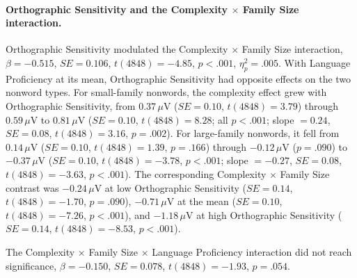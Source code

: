 \paragraph*{Orthographic Sensitivity and the Complexity $\times$ Family Size interaction.} Orthographic Sensitivity modulated the Complexity $\times$ Family Size interaction, $\beta = -0.515$, $SE = 0.106$, $t(4848) = -4.85$, $p < .001$, $\eta^2_p = .005$. With Language Proficiency at its mean, Orthographic Sensitivity had opposite effects on the two nonword types. For small-family nonwords, the complexity effect grew with Orthographic Sensitivity, from $0.37\,\mu$V ($SE = 0.10$, $t(4848) = 3.79$) through $0.59\,\mu$V to $0.81\,\mu$V ($SE = 0.10$, $t(4848) = 8.28$; all $p < .001$; slope $= 0.24$, $SE = 0.08$, $t(4848) = 3.16$, $p = .002$). For large-family nonwords, it fell from $0.14\,\mu$V ($SE = 0.10$, $t(4848) = 1.39$, $p = .166$) through $-0.12\,\mu$V ($p = .090$) to $-0.37\,\mu$V ($SE = 0.10$, $t(4848) = -3.78$, $p < .001$; slope $= -0.27$, $SE = 0.08$, $t(4848) = -3.63$, $p < .001$). The corresponding Complexity $\times$ Family Size contrast was $-0.24\,\mu$V at low Orthographic Sensitivity ($SE = 0.14$, $t(4848) = -1.70$, $p = .090$), $-0.71\,\mu$V at the mean ($SE = 0.10$, $t(4848) = -7.26$, $p < .001$), and $-1.18\,\mu$V at high Orthographic Sensitivity ($SE = 0.14$, $t(4848) = -8.53$, $p < .001$).

The Complexity $\times$ Family Size $\times$ Language Proficiency interaction did not reach significance, $\beta = -0.150$, $SE = 0.078$, $t(4848) = -1.93$, $p = .054$.

